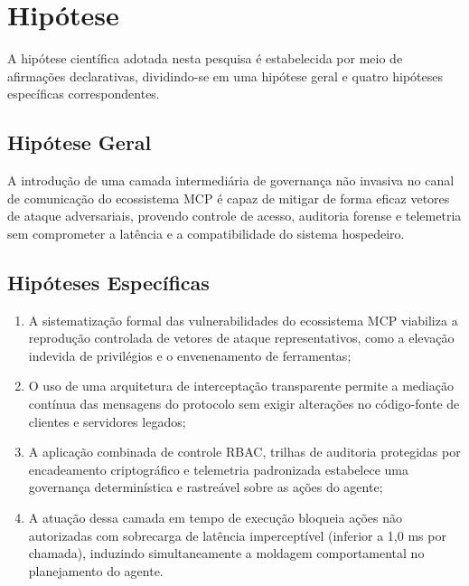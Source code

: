 \section{Hipótese}
\label{sec:hipotese}

A hipótese científica adotada nesta pesquisa é estabelecida por meio de afirmações declarativas, dividindo-se em uma hipótese geral e quatro hipóteses específicas correspondentes.

\subsection{Hipótese Geral}
\label{subsec:hipotese_geral}
A introdução de uma camada intermediária de governança não invasiva no canal de comunicação do ecossistema MCP é capaz de mitigar de forma eficaz vetores de ataque adversariais, provendo controle de acesso, auditoria forense e telemetria sem comprometer a latência e a compatibilidade do sistema hospedeiro.

\subsection{Hipóteses Específicas}
\label{subsec:hipoteses_especificas}
\begin{enumerate}
  \item A sistematização formal das vulnerabilidades do ecossistema MCP viabiliza a reprodução controlada de vetores de ataque representativos, como a elevação indevida de privilégios e o envenenamento de ferramentas;
  \item O uso de uma arquitetura de interceptação transparente permite a mediação contínua das mensagens do protocolo sem exigir alterações no código-fonte de clientes e servidores legados;
  \item A aplicação combinada de controle RBAC, trilhas de auditoria protegidas por encadeamento criptográfico e telemetria padronizada estabelece uma governança determinística e rastreável sobre as ações do agente;
  \item A atuação dessa camada em tempo de execução bloqueia ações não autorizadas com sobrecarga de latência imperceptível (inferior a 1,0 ms por chamada), induzindo simultaneamente a moldagem comportamental no planejamento do agente.
\end{enumerate}

